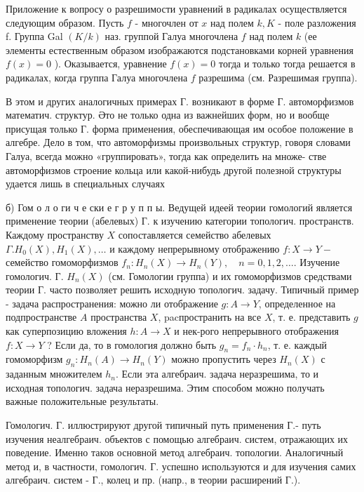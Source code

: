 \documentclass[10pt]{article}
\begin{document}
Приложение к вопросу о разрешимости уравнений в радикалах осуществляется следующим образом. Пусть $f$ - многочлен от $x$ над полем $k, K$ - поле разложения f. Группа Gal $(K / k)$ наз. группой Галуа многочлена $f$ над полем $k$ (ее элементы естественным образом изображаются подстановками корней уравнения $f(x)=0$ ). Оказывается, уравнение $f(x)=0$ тогда и только тогда решается в радикалах, когда группа Галуа многочлена $f$ разрешима (см. Разрешимая группа).



В этом и других аналогичных примерах Г. возникают в форме Г. автоморфизмов математич. структур. Әто не только одна из важнейших форм, но и вообще присущая только Г. форма применения, обеспечивающая им особое положение в алгебре. Дело в том, что автоморфизмы произвольных структур, говоря словами Галуа, всегда можно «группировать», тогда как определить на множе- стве автоморфизмов строение кольца или какой-нибудь другой полезной структуры удается лишь в специальных случаях



б) Гом о л о ги ч е ски е г р у п п ы. Ведущей идеей теории гомологий является применение теории (абелевых) Г. к изучению категории топологич. пространств. Каждому пространству $X$ сопоставляется семейство абелевых $\Gamma . H_{0}(X), H_{1}(X), \ldots$ и каждому непрерывному отображению $f: X \rightarrow Y-$ семейство гомоморфизмов $f_{n}: H_{n}(X) \rightarrow H_{n}(Y), \quad n=0,1,2, \ldots$. Изучение гомологич. Г. $H_{n}(X)$ (см. Гомологии группа) и их гомоморфизмов средствами теории $Г$. часто позволяет решить исходную топологич. задачу. Типичный пример - задача распространения: можно ли отображение $g: A \rightarrow Y$, определенное на подпространстве $A$ пространства $X$, pacпространить на все $X$, т. е. представить $g$ как суперпозицию вложения $h: A \rightarrow X$ и нек-рого непрерывного отображения $f: X \rightarrow Y$ ? Если да, то в гомология должно быть $g_{n}=f_{n} \cdot h_{n}$, т. е. каждый гомоморфизм $g_{n}: H_{n}(A) \rightarrow H_{n}(Y)$ можно пропустить через $H_{n}(X)$ с заданным множителем $h_{n}$. Если эта алгебраич. задача неразрешима, то и исходная топологич. задача неразрешима. Этим способом можно получать важные положительные результаты.



Гомологич. Г. иллюстрируют другой типичный путь применения Г.- путь изучения неалгебраич. объектов с помощью алгебраич. систем, отражающих их поведение. Именно таков основной метод алгебраич. топологии. Аналогичный метод и, в частности, гомологич. Г. успешно используются и для изучения самих алгебраич. систем - Г., колец и пр. (напр., в теории расширений Г.).
\end{document}

